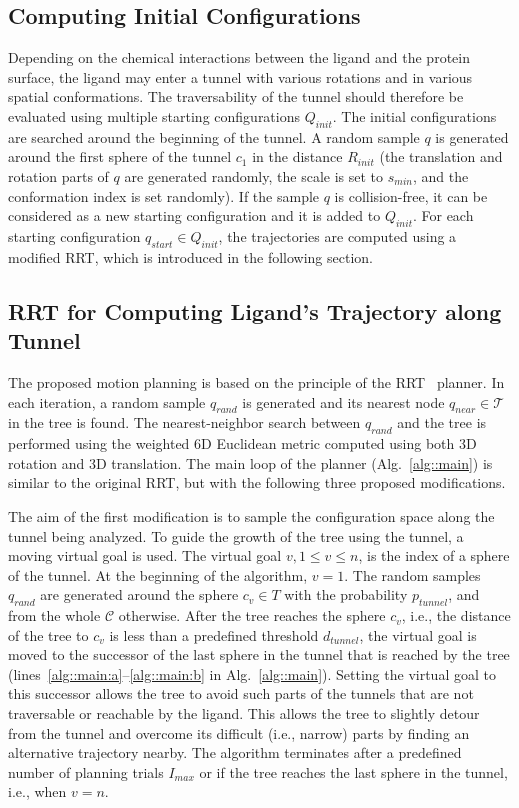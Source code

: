 \documentclass[usletter, 10pt, conference]{ieeeconf} %
\def\qrand{q_{rand}}
\def\qstart{q_{start}}
\def\qinit{\qstart}
\def\qgoal{q_{goal}}
\def\qnear{q_{near}}
\def\T{\mathcal{T}}
\def\C{\mathcal{C}}
\def\dt{d_{tunnel}}
\def\QI{Q_{init}}
\def\RI{R_{init}}
\def\Imax{I_{max}} %
\def\smin{s_{min}}
\def\gb{p_{tunnel}}
\begin{document}
{\subsection{Computing Initial Configurations}

Depending on the chemical interactions between the ligand and the protein surface, the ligand may enter a tunnel with various rotations and in various spatial conformations.
The traversability of the tunnel should therefore be evaluated using multiple starting configurations $\QI$.
The initial configurations are searched around the beginning of the tunnel.
A random sample $q$ is generated around the first sphere of the tunnel 
$c_1$ in the distance $\RI$ (the translation and rotation parts of $q$ are generated randomly, the scale is set to $\smin$, and the conformation index is set randomly).
If the sample $q$ is collision-free, it can be considered as a new starting configuration and it is added to $\QI$.
For each starting configuration $\qinit \in \QI$, the trajectories are computed using a modified RRT, which is introduced in the following section.


\subsection{RRT for Computing Ligand's Trajectory along Tunnel}

The proposed motion planning is based on the principle of the RRT~\cite{lavalleRRT} planner.
In each iteration, a random sample $\qrand$ is generated and its nearest node $\qnear\in\T$ in the tree is found.
The nearest-neighbor search between $\qrand$ and the tree is performed using the weighted 6D Euclidean metric computed using
both 3D rotation and 3D translation.
The main loop of the planner (Alg.~\ref{alg::main}) is similar to the original RRT, but with the following three proposed modifications.

The aim of the first modification is to sample the configuration space along the tunnel being analyzed.
To guide the growth of the tree using the tunnel, a moving virtual goal is used. %
The virtual goal $v, 1\le v \le n$, is the index of a sphere of the tunnel.
At the beginning of the algorithm, $v=1$.
The random samples $\qrand$ are generated around the sphere $c_v \in T$ with the probability $\gb$, and from the whole $\C$ otherwise.
After the tree reaches the sphere $c_v$, i.e., the distance of the tree to $c_v$ is
less than a predefined threshold $\dt$, the virtual goal is moved to the successor of the last sphere in the tunnel
that is reached by the tree (lines~\ref{alg::main:a}--\ref{alg::main:b} in Alg.~\ref{alg::main}).
Setting the virtual goal to this successor allows the tree to avoid such parts of the tunnels that are not traversable or reachable by the ligand.
This allows the tree to slightly detour from the tunnel and overcome its difficult (i.e., narrow) parts by finding an alternative trajectory nearby.
The algorithm terminates after a predefined number of planning trials $\Imax$ or if the tree reaches
the last sphere in the tunnel, i.e., when $v = n$.

}
\end{document}
